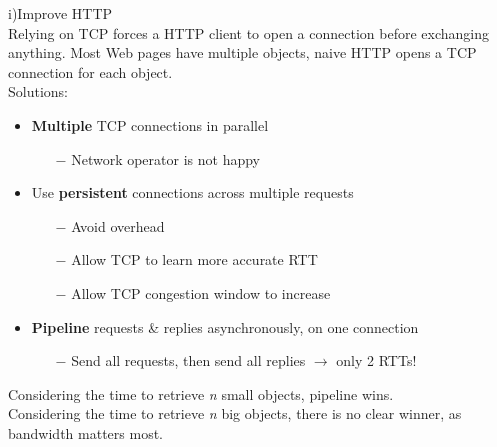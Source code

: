 \documentclass[a4paper, fontsize=8pt, landscape, DIV=1]{scrartcl}
\begin{document}
\begin{multicols*}{4}
		i)Improve HTTP\\
		Relying on TCP forces a HTTP client to open a connection before exchanging
		anything. Most Web pages have multiple objects, naive HTTP opens a TCP
		connection for each object.\\
		Solutions:
		\begin{itemize}[noitemsep]
			\item \textbf{Multiple} TCP connections in parallel
			\begin{itemize}
				\item[$-$] Network operator is not happy
			\end{itemize}
			\item Use \textbf{persistent} connections across multiple requests
			\begin{itemize}
				\item[$-$] Avoid overhead
				\item[$-$] Allow TCP to learn more accurate RTT
				\item[$-$] Allow TCP congestion window to increase
			\end{itemize}
			\item \textbf{Pipeline} requests \& replies asynchronously, on one connection
			\begin{itemize}
				\item[$-$] Send all requests, then send all replies $\rightarrow$ only 2
				RTTs!
			\end{itemize}
		\end{itemize}
		Considering the time to retrieve \textit{n} small objects, pipeline wins.\\
		Considering the time to retrieve \textit{n} big objects, there is no clear
		winner, as bandwidth matters most.\par 
		

\end{multicols*}
\end{document}
